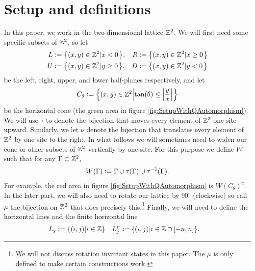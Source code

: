 \documentclass[11pt,a4paper,twoside]{article}
\numberwithin{equation}{section}
\begin{document}
	\section{Setup and definitions}\label{sec:Setup}
	In this paper, we work in the two-dimensional lattice $\mathbb Z^2$. We will first need some specific subsets of $\mathbb Z^2$, so let
	\begin{align}
		L&\defeq \left\{(x,y)\in\ZZ^2\left|x<0\right.\right\},&R&\defeq \left\{(x,y)\in\ZZ^2\left|x\geq 0\right.\right\}\\
		U&\defeq \left\{(x,y)\in\ZZ^2\left|y\geq 0\right.\right\},&D&\defeq \left\{(x,y)\in\ZZ^2\left|y<0\right.\right\}
	\end{align}
	be the left, right, upper, and lower half-planes respectively, and let
	\begin{equation}
		C_\theta\defeq \left\{(x,y)\in\ZZ^2\left|\tan(\theta)\leq\abs{\frac{y}{x}}\right.\right\}
	\end{equation}
	be the horizontal cone (the green area in figure \ref{fig:SetupWithQAutomorphism}). We will use $\tau$ to denote the bijection that moves every element of $\mathbb Z^2$ one site upward. Similarly, we let $\nu$ denote the bijection that translates every element of $\mathbb Z^2$ by one site to the right. In what follows we will sometimes need to widen our cone or other subsets of $\mathbb Z^2$ vertically by one site. For this purpose we define $W$ such that for any $\Gamma\subset\mathbb Z^2$,
	\begin{equation}
		W(\Gamma)\vcentcolon= \Gamma\cup\tau(\Gamma)\cup\tau^{-1}(\Gamma).
	\end{equation}
	For example, the red area in figure \ref{fig:SetupWithQAutomorphism} is $W(C_\theta)^c$. In the later part, we will also need to rotate our lattice by $90^\circ$ (clockwise) so call $\mu$ the bijection on $\mathbb Z^2$ that does precisely this.\footnote{We will not discuss rotation invariant states in this paper. The $\mu$ is only defined to make certain constructions work.} Finally, we will need to define the horizontal lines and the finite horizontal line
	\begin{align}
		L_j&\vcentcolon= \{(i,j)|i\in\mathbb Z\}&L_j^n&\vcentcolon= \{(i,j)|i\in\mathbb Z\cap[-n,n]\}.
	\end{align}
\end{document}
